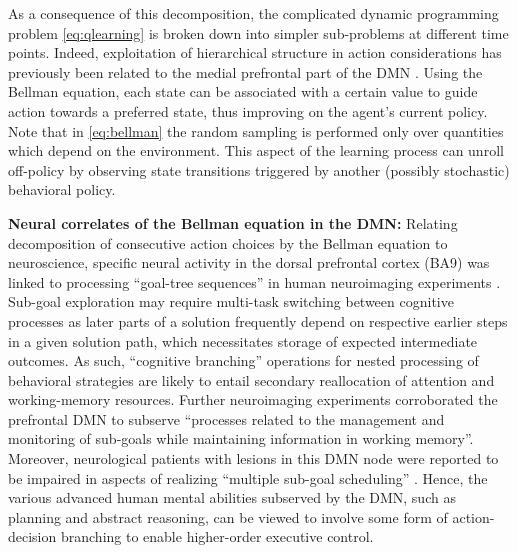 \documentclass[10pt,letterpaper]{article}
\begin{document}
As a consequence of this decomposition, the complicated dynamic programming
problem \eqref{eq:qlearning}
is broken down into simpler sub-problems at different time points.
Indeed,
exploitation of hierarchical structure in action considerations
has previously been related to the medial prefrontal part of the DMN
\citep{koechlin1999role, braver2002role}.
Using the Bellman equation, each state can be associated with a certain value
to guide action towards a preferred state, thus improving on the agent's current policy.
Note that in \eqref{eq:bellman} the random sampling
is performed only over quantities which
depend on the environment.
This aspect of the learning process
can unroll off-policy by observing state transitions
triggered by another (possibly stochastic) behavioral policy.


\begin{mdframed}
\textbf{Neural correlates of the Bellman equation in the DMN:}
Relating decomposition of consecutive action choices by the Bellman equation
to neuroscience,
specific neural activity in the dorsal prefrontal cortex (BA9)
was linked to processing ``goal-tree sequences''
in human neuroimaging experiments
\citep{koechlin1999role, koechlin2000dissociating}.
Sub-goal exploration may require multi-task switching
between cognitive processes
as later parts of a solution
frequently depend on respective earlier steps in a given solution path, which
necessitates storage of expected intermediate outcomes.
As such,
``cognitive branching'' operations for nested processing of behavioral strategies
are likely to
entail secondary reallocation of attention and working-memory resources.
Further neuroimaging experiments \citep{braver2002role} corroborated
the prefrontal DMN to subserve
``processes related to the management and monitoring of sub-goals while maintaining information in working memory''.
%
Moreover,
neurological patients with lesions in this DMN node were reported
to be impaired in aspects of realizing ``multiple sub-goal scheduling''
\citep{burgess2000cognitive}.
Hence,
the various advanced human mental abilities subserved by the DMN, such as
planning and abstract reasoning, can be viewed to involve some form of
action-decision branching to enable higher-order executive control.
\end{mdframed}


\end{document}
